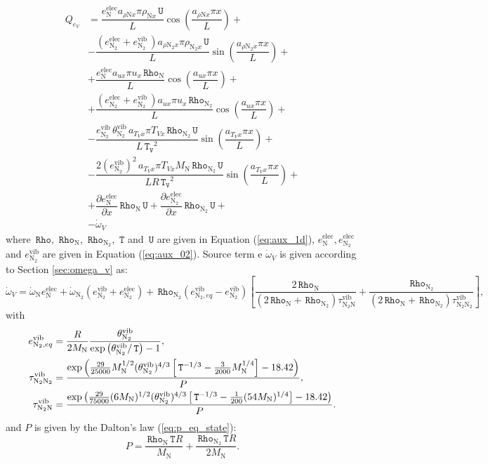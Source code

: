 \documentclass[10pt]{article}
\newcommand{\diff}[2] {\dfrac{\partial #1 }{\partial #2}}
\newcommand{\Rho}{\,\mathtt{Rho}}
\newcommand{\T}{\,\mathtt{T}}
\newcommand{\U}{\,\mathtt{U}}
\newcommand{\TV}{\,\mathtt{T_V}}
\newcommand{\N}{\text{N}}
\newcommand{\elec}{\text{elec}}
\newcommand{\vib}{\text{vib}}
\begin{document}
\begin{equation}
\begin{split}
Q_{e_V} &= \dfrac{e_{\N}^{\elec} a_{  \rho \N x } \pi \rho_{\N x} \U }{L} \cos\left(\dfrac{a_{  \rho \N x } \pi x}{L}\right) +\\ 
&- \dfrac{(e_{\N_2}^{\elec}+e_{\N_2}^{\vib} \, ) a_{  \rho \N_2 x } \pi \rho_{\N_2 x} \U }{L} \sin\left(\dfrac{a_{  \rho \N_2 x } \pi x}{L}\right)  +\\ 
&+ \dfrac{e_{\N}^{\elec} a_{ux} \pi u_x \Rho_{\N} }{L} \cos\left(\dfrac{a_{ux} \pi x}{L}\right)+\\ 
&+ \dfrac{(e_{\N_2}^{\elec}+e_{\N_2}^{\vib} \, ) a_{ux} \pi u_x \Rho_{\N_2} }{L}\cos\left(\dfrac{a_{ux} \pi x}{L}\right)  +\\ 
&-\dfrac{e_{\N_2}^{\vib} \, \theta^{\vib}_{\N_2} \, a_{T_V x} \pi T_{Vx}   \Rho_{\N_2} \U}{L \TV^2} \sin\left(\dfrac{a_{T_V x} \pi x}{L}\right) +\\
&-\dfrac{2 (e_{\N_2}^{\vib})^2 \, a_{T_V x} \pi T_{Vx} M_\N \Rho_{\N_2} \U }{L R \TV^2}\sin\left(\dfrac{a_{T_V x} \pi x}{L}\right) +\\
&+\diff{e_{\N}^{\elec}}{x} \Rho_{\N} \U+\diff{e_{\N_2}^{\elec}}{x} \Rho_{\N_2} \U +\\
&- \dot{\omega}_V
\end{split}
\end{equation}
%
where   $\Rho,\,\Rho_{\text{N}},\,\Rho_{\text{N}_2},\, \T$ and $\U$ are given  in Equation (\ref{eq:aux_1d}),   $e_{\N}^{\elec}, e_{\N_2}^{\elec}$ and $e_{\N_2}^{\vib}  $ are given in Equation (\ref{eq:aux_02}). Source term e $\dot{\omega}_V$ is given according to Section \ref{sec:omega_v} as:
$$\dot{\omega}_V = \dot{\omega}_\N e_{\N}^{\elec} + \dot{\omega}_{\N_2} (e_{\N_2}^{\vib}+e_{\N_2}^{\elec})+\Rho_{\N_2} (e_{\N_2,eq}^{\vib}-e_{\N_2}^{\vib}) \left[\dfrac{2 \Rho_{\N}}{(2 \Rho_{\N}+\Rho_{\N_2}) \tau^{\vib}_{\N_2\N}}+\dfrac{\Rho_{\N_2}}{(2 \Rho_{\N}+\Rho_{\N_2}) \tau^{\vib}_{\N_2\N_2}}\right],$$
with
\begin{equation}
\begin{split}
e_{\N_2, eq}^{\vib} &= \dfrac{R}{2 M_\N} \frac{\theta^{\vib}_{\N_2}}{\exp\left(\theta^{\vib}_{\N_2}/ \T \right) - 1} , \vspace{5pt}\\
\tau^{\vib}_{\N_2\N_2} &= \dfrac{ \exp\left(\frac{29}{25000} M_\N^{1/2} (\theta^{\vib}_{\N_2})^{4/3}  \left[\T^{-1/3}-\frac{3}{2000} M_\N^{1/4}\right] -18.42\right)}{P}, \vspace{5pt}\\
\tau^{\vib}_{\N_2\N} &=\dfrac{ \exp\left(\frac{29}{75000} (6 M_\N)^{1/2} (\theta^{\vib}_{\N_2})^{4/3} \left[\T^{-1/3} -\frac{1}{200} (54M_\N)^{1/4}\right]-18.42\right)}{P}.
\end{split}
\end{equation}
and $P$ is given by the Dalton's law (\ref{eq:p_eq_state}):
$$P = \dfrac{\Rho_{\N}  \T R}{M_\N}+ \dfrac{\Rho_{\N_2}  \T R}{2 M_\N}.$$
\end{document}
